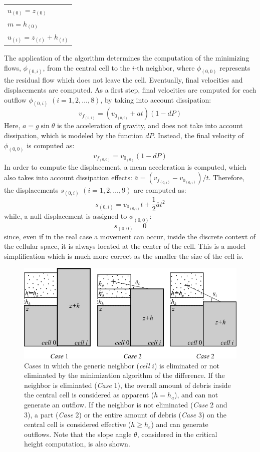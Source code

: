 \begin{tabular}{l}
$u_{(0)} = z_{(0)}$\\
$m = h_{(0)}$\\
$u_{(i)} = z_{(i)} + h_{(i)}$
\end{tabular}

The application of the algorithm determines the computation of the minimizing flows, $\phi_{(0,i)}$, from the central cell to the $i$-th neighbor, where $\phi_{(0,0)}$ represents the residual flow which does not leave the cell. Eventually, final velocities and displacements are computed. As a first step, final velocities are computed for each outflow $\phi_{(0,i)}$ $(i=1,2, \ldots, 8)$, by taking into account dissipation:
$$
v_{f_{(0,i)}} = (v_{0_{(0,i)}} + a t)(1-dP)
$$
Here, $a = g \sin \theta$ is the acceleration of gravity, and does not take into account dissipation, which is modeled by the function $dP$. Instead, the final velocity of $\phi_{(0,0)}$ is computed as:
$$
v_{f_{(0,0)}} = v_{0_{(0)}}(1-dP)
$$
In order to compute the displacement, a mean acceleration is computed, which also takes into account dissipation effects: $\overline{a} = (v_{f_{(0,i)}} - v_{0_{(0,i)}})/t$. Therefore, the displacements $s_{(0,i)}$ $(i = 1,2, \ldots, 9)$ are computed as:
$$
s_{(0,i)} = v_{0_{(0,i)}} t + \frac{1}{2} \overline{a} t^2
$$
while, a null displacement is assigned to $\phi_{(0,0)}$:
$$
s_{(0,0)} = 0
$$
since, even if in the real case a movement can occur, inside the discrete context of the cellular space, it is always located at the center of the cell. This is a model simplification which is much more correct as the smaller the size of the cell is.

\begin{figure}[!t]
\centering
\includegraphics[scale=0.8]{./images/fig2PDP}
\caption{Cases in which the generic neighbor (\textit{cell} $i$) is
eliminated or not eliminated by the minimization algorithm of the difference. If the neighbor is eliminated (\textit{Case} 1), the overall amount of debris inside the central cell is considered as apparent ($h=h_a$), and can not generate an outflow. If the neighbor is not eliminated (\textit{Case} 2 and 3), a part (\textit{Case} 2) or the entire amount of debris (\textit{Case} 3) on the central cell is considered effective ($h \geq h_e$) and can generate outflows. Note that the slope angle $\theta$, considered in the critical height computation, is also shown.}
\label{fig:cases}
\end{figure}

